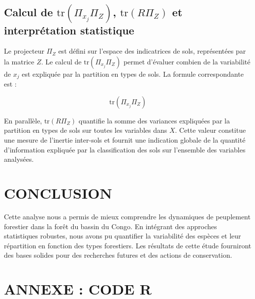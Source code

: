 \documentclass[
]{article}
\begin{document}
\hypertarget{calcul-de-texttrpi_x_j-pi_z-texttrr-pi_z-et-interpruxe9tation-statistique}{%
\subsection{\texorpdfstring{Calcul de \(\text{tr}(\Pi_{x_j} \Pi_Z)\),
\(\text{tr}(R \Pi_Z)\) et interprétation
statistique}{Calcul de \textbackslash text\{tr\}(\textbackslash Pi\_\{x\_j\} \textbackslash Pi\_Z), \textbackslash text\{tr\}(R \textbackslash Pi\_Z) et interprétation statistique}}\label{calcul-de-texttrpi_x_j-pi_z-texttrr-pi_z-et-interpruxe9tation-statistique}}

Le projecteur \(\Pi_Z\) est défini sur l'espace des indicatrices de
sols, représentées par la matrice \(Z\). Le calcul de
\(\text{tr}(\Pi_{x_j} \Pi_Z)\) permet d'évaluer combien de la
variabilité de \(x_j\) est expliquée par la partition en types de sols.
La formule correspondante est :

\[
\text{tr}(\Pi_{x_j} \Pi_Z)
\]

En parallèle, \(\text{tr}(R \Pi_Z)\) quantifie la somme des variances
expliquées par la partition en types de sols sur toutes les variables
dans \(X\). Cette valeur constitue une mesure de l'inertie inter-sols et
fournit une indication globale de la quantité d'information expliquée
par la classification des sols sur l'ensemble des variables analysées.

\hypertarget{conclusion}{%
\section{CONCLUSION}\label{conclusion}}

Cette analyse nous a permis de mieux comprendre les dynamiques de
peuplement forestier dans la forêt du bassin du Congo. En intégrant des
approches statistiques robustes, nous avons pu quantifier la variabilité
des espèces et leur répartition en fonction des types forestiers. Les
résultats de cette étude fourniront des bases solides pour des
recherches futures et des actions de conservation.

\newpage

\hypertarget{annexe-code-r}{%
\section{ANNEXE : CODE R}\label{annexe-code-r}}
\end{document}
